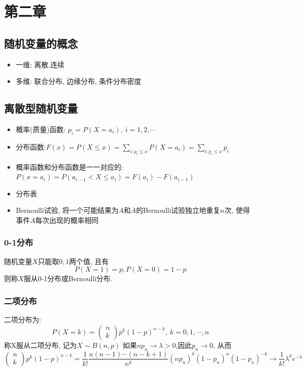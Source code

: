 \documentclass[UTF8]{article}
\newcommand{\itemblt}{\item[$\bullet$]}
\newcommand{\comb}[2]{\left(\begin{array}{c}#1\\#2\end{array}\right)}
\begin{document}
\section{第二章}

\subsection{随机变量的概念}
\begin{itemize}
	\itemblt 一维: 离散,连续
	\itemblt 多维: 联合分布, 边缘分布, 条件分布密度
\end{itemize}

\subsection{离散型随机变量}
\begin{itemize}
	\itemblt 概率(质量)函数: $p_i=P(X=a_i),\ i=1,2,\cdots$
	\itemblt 分布函数:$F(x)=P(X\le x)=\sum\limits_{i:p_i\le x}P(X=a_i)=\sum\limits_{i:p_i\le x}p_i$
	\itemblt 概率函数和分布函数是一一对应的:\\
	$P(x=a_i)=P(a_{i-1}< X\le a_i)=F(a_i)-F(a_{i-1})$
	\itemblt 分布表
	\itemblt Bernoulli试验, 将一个可能结果为$A$和$\overline{A}$的Bernoulli试验独立地重复$n$次, 使得事件$A$每次出现的概率相同
\end{itemize}


\subsubsection{0-1分布}
随机变量$X$只能取$0,1$两个值, 且有
$$P(X=1)=p, P(X=0)=1-p$$
则称$X$服从0-1分布或Bernoulli分布.
\subsubsection{二项分布}
二项分布为:
$$P(X=k)=\comb{n}{k}p^k(1-p)^{n-k},\ k=0,1,\cdots,n$$
称X服从二项分布, 记为$X\sim B(n,p)$
如果$np_n\rightarrow \lambda>0$,因此$p_n\rightarrow 0$, 从而
$$\comb{n}{k}p^k(1-p)^{n-k}=\frac{1}{k!}\frac{n(n-1)\cdots(n-k+1)}{n^k}(np_n)^k(1-p_n)^n(1-p_n)^{-k}\rightarrow\frac{1}{k!}\lambda^ke^{-\lambda}$$
\end{document}
